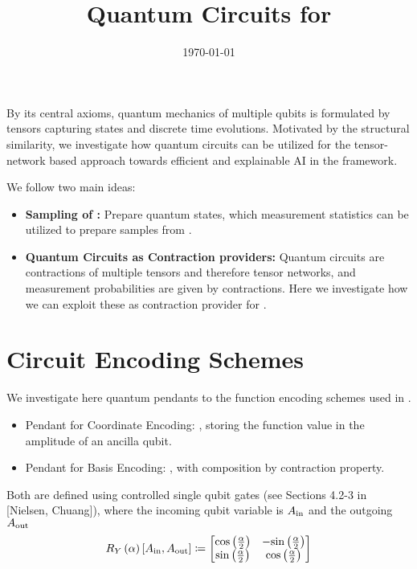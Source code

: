 \documentclass[aps,onecolumn,nofootinbib,pra]{article}
\begin{document}
    \title{Quantum Circuits for \tnreason{}}

    \maketitle
    \date{\today}

    By its central axioms, quantum mechanics of multiple qubits is formulated by tensors capturing states and discrete time evolutions.
    Motivated by the structural similarity, we investigate how quantum circuits can be utilized for the tensor-network based approach towards efficient and explainable AI in the \tnreason{} framework.

    We follow two main ideas:
    \begin{itemize}
        \item \textbf{Sampling of \ComputationActivationNetworks{}:} Prepare quantum states, which measurement statistics can be utilized to prepare samples from \ComputationActivationNetworks{}.
        \item \textbf{Quantum Circuits as Contraction providers:} Quantum circuits are contractions of multiple tensors and therefore tensor networks, and measurement probabilities are given by contractions.
        Here we investigate how we can exploit these as contraction provider for \tnreason{}.
    \end{itemize}

    \tableofcontents


    \section{Circuit Encoding Schemes}

    We investigate here quantum pendants to the function encoding schemes used in \tnreason{}{}.

    \begin{itemize}
        \item Pendant for Coordinate Encoding: \textbf{\ActivationCircuit{}}, storing the function value in the amplitude of an ancilla qubit.
        \item Pendant for Basis Encoding: \textbf{\ComputationCircuit{}}, with composition by contraction property.
    \end{itemize}

    Both are defined using controlled single qubit gates (see Sections 4.2-3 in [Nielsen, Chuang]), where the incoming qubit variable is $A_{\mathrm{in}}$ and the outgoing $A_{\mathrm{out}}$
    \begin{align*}
        R_Y\left({\alpha}\right)\left[A_{\mathrm{in}},A_{\mathrm{out}}\right] \coloneqq
        \begin{bmatrix}
            \mathrm{cos}\left(\frac{\alpha}{2}\right) & -\mathrm{sin}\left(\frac{\alpha}{2}\right) \\
            \mathrm{sin}\left(\frac{\alpha}{2}\right) & \mathrm{cos}\left(\frac{\alpha}{2}\right)
        \end{bmatrix}
    \end{align*}
\end{document}
